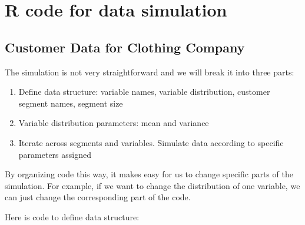 \documentclass[
  12pt,
]{krantz}
\providecommand{\tightlist}{%
  \setlength{\itemsep}{0pt}\setlength{\parskip}{0pt}}
\begin{document}
\hypertarget{r-code-for-data-simulation}{%
\chapter{R code for data simulation}\label{r-code-for-data-simulation}}

\hypertarget{appendixdata1}{%
\section{Customer Data for Clothing Company}\label{appendixdata1}}

The simulation is not very straightforward and we will break it into three parts:

\begin{enumerate}
\def\labelenumi{\arabic{enumi}.}
\tightlist
\item
  Define data structure: variable names, variable distribution, customer segment names, segment size
\item
  Variable distribution parameters: mean and variance
\item
  Iterate across segments and variables. Simulate data according to specific parameters assigned
\end{enumerate}

By organizing code this way, it makes easy for us to change specific parts of the simulation. For example, if we want to change the distribution of one variable, we can just change the corresponding part of the code.

Here is code to define data structure:
\end{document}
